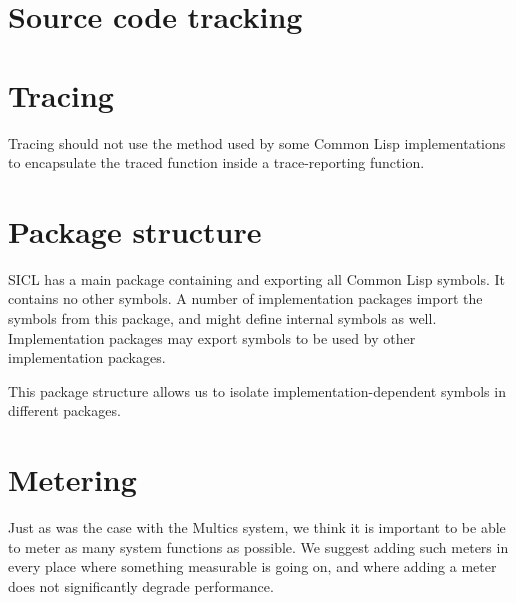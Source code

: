\documentclass{article}
\def\sysname{SICL}
\begin{document}
\section{Source code tracking}

\section{Tracing}

Tracing should not use the method used by some Common Lisp
implementations to encapsulate the traced function inside a
trace-reporting function.

\section{Package structure}

{\sysname} has a main package containing and exporting all Common Lisp
symbols.  It contains no other symbols.  A number of implementation
packages import the symbols from this package, and might define
internal symbols as well.  Implementation packages may export symbols
to be used by other implementation packages.

This package structure allows us to isolate implementation-dependent
symbols in different packages.  

\section{Metering}

Just as was the case with the Multics system, we think it is important
to be able to meter as many system functions as possible.  We suggest
adding such meters in every place where something measurable is going
on, and where adding a meter does not significantly degrade
performance.  
\end{document}
